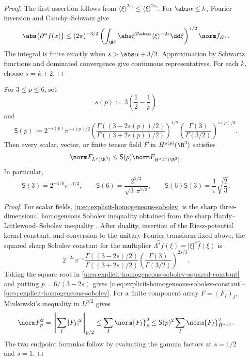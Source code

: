 \begin{proof}
The first assertion follows from
\(\langle\xi\rangle^{2s_1}\le\langle\xi\rangle^{2s_2}\).
For \(\abs\alpha\le k\), Fourier inversion and Cauchy--Schwarz give
\[
 \abs{\partial^\alpha f(x)}
 \le(2\pi)^{-3/2}
 \left(\int_{\R^3}\abs\xi^{2\abs\alpha}
 \langle\xi\rangle^{-2s}\dd\xi\right)^{1/2}
 \norm f_{H^s}.
\]
The integral is finite exactly when \(s>\abs\alpha+3/2\).
Approximation by Schwartz functions and dominated convergence give continuous
representatives.  For each \(k\), choose \(s=k+2\).
\end{proof}

\begin{lemma}
\label{u:lem:explicit-homogeneous-sobolev}
For \(3\le p\le6\), set
\[
 s(p):=3\left(\frac12-\frac1p\right)
\]
and
\begin{equation}
 \mathsf S(p):=
 2^{-s(p)}\pi^{-s(p)/2}
 \left(
  \frac{\Gamma((3-2s(p))/2)}
       {\Gamma((3+2s(p))/2)}
 \right)^{1/2}
 \left(\frac{\Gamma(3)}{\Gamma(3/2)}\right)^{s(p)/3}.
 \label{u:eq:explicit-homogeneous-sobolev-constant}
\end{equation}
Then every scalar, vector, or finite tensor field \(F\) in
\(\dot H^{s(p)}(\R^3)\) satisfies
\begin{equation}
 \norm F_{L^p(\R^3)}
 \le \mathsf S(p)\norm F_{\dot H^{s(p)}(\R^3)}.
 \label{u:eq:explicit-homogeneous-sobolev}
\end{equation}
In particular,
\[
 \mathsf S(3)=2^{-1/6}\pi^{-1/3},
 \qquad
 \mathsf S(6)=\frac{2^{2/3}}{\sqrt3\,\pi^{2/3}},
 \qquad
 \mathsf S(6)\mathsf S(3)=\frac1\pi\sqrt{\frac23}.
\]
\end{lemma}

\begin{proof}
For scalar fields, \eqref{u:eq:explicit-homogeneous-sobolev} is the sharp
three-dimensional homogeneous Sobolev inequality obtained from the sharp
Hardy--Littlewood--Sobolev inequality \cite{Lieb1983}.  After duality,
insertion of the Riesz-potential kernel constant, and conversion to the
unitary Fourier transform fixed above, the squared sharp Sobolev constant for
the multiplier
\(\widehat{\Lambda^sf}(\xi)=|\xi|^s\widehat f(\xi)\) is
\begin{equation}
 2^{-2s}\pi^{-s}
 \frac{\Gamma((3-2s)/2)}{\Gamma((3+2s)/2)}
 \left(\frac{\Gamma(3)}{\Gamma(3/2)}\right)^{2s/3}.
 \label{u:eq:explicit-homogeneous-sobolev-squared-constant}
\end{equation}
Taking the square root in
\eqref{u:eq:explicit-homogeneous-sobolev-squared-constant} and putting
\(p=6/(3-2s)\) gives
\eqref{u:eq:explicit-homogeneous-sobolev-constant}--
\eqref{u:eq:explicit-homogeneous-sobolev}.  For a finite component array
\(F=(F_I)_I\), Minkowski's inequality in \(L^{p/2}\) gives
\[
 \norm F_p^2
 =\left\|\sum_I|F_I|^2\right\|_{p/2}
 \le\sum_I\norm{F_I}_p^2
 \le\mathsf S(p)^2\sum_I\norm{F_I}_{\dot H^{s(p)}}^2.
\]
The two endpoint formulas follow by evaluating the gamma factors at
\(s=1/2\) and \(s=1\).
\end{proof}

